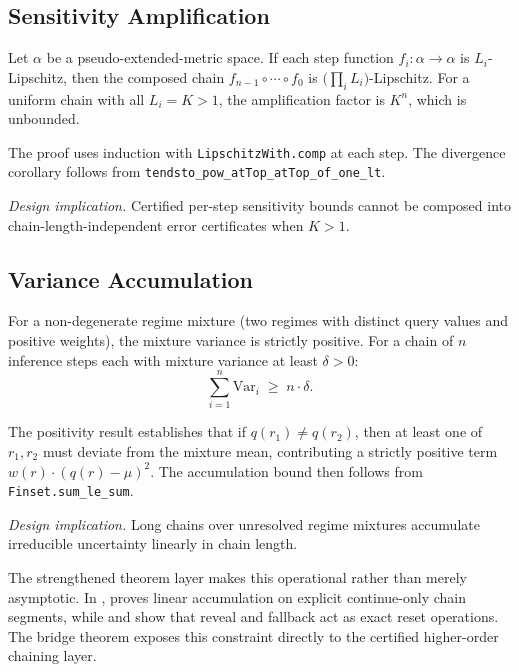 \documentclass[11pt,openany]{report}
\begin{document}
\subsection*{Sensitivity Amplification}

\boundarystart
\begin{theorem}
\label{thm:sensitivity-amplification}
Let $\alpha$ be a pseudo-extended-metric space.  If each step function
$f_i : \alpha \to \alpha$ is $L_i$-Lipschitz, then the composed chain
$f_{n-1} \circ \cdots \circ f_0$ is $\bigl(\prod_{i} L_i\bigr)$-Lipschitz.
For a uniform chain with all $L_i = K > 1$, the amplification factor is
$K^n$, which is unbounded.
\end{theorem}
\boundaryend

The proof uses induction with \texttt{LipschitzWith.comp} at each step.
The divergence corollary follows from
\texttt{tendsto\_pow\_atTop\_atTop\_of\_one\_lt}.

\textit{Design implication.}  Certified per-step sensitivity bounds cannot
be composed into chain-length-independent error certificates when $K > 1$.

\subsection*{Variance Accumulation}

\boundarystart
\begin{theorem}
\label{thm:variance-accumulation}
For a non-degenerate regime mixture (two regimes with distinct query values
and positive weights), the mixture variance is strictly positive.
For a chain of $n$ inference steps each with mixture variance at least
$\delta > 0$:
\[
  \sum_{i=1}^{n} \mathrm{Var}_i \;\ge\; n \cdot \delta.
\]
\end{theorem}
\boundaryend

The positivity result establishes that if $q(r_1) \ne q(r_2)$, then
at least one of $r_1, r_2$ must deviate from the mixture mean, contributing
a strictly positive term $w(r) \cdot (q(r) - \mu)^2$.  The accumulation bound
then follows from \texttt{Finset.sum\_le\_sum}.

\textit{Design implication.}  Long chains over unresolved regime mixtures
accumulate irreducible uncertainty linearly in chain length.

The strengthened theorem layer makes this operational rather than merely
asymptotic.  In
,
 proves linear
accumulation on explicit continue-only chain segments, while
 and
 show that reveal and fallback
act as exact reset operations.  The bridge theorem
 exposes this
constraint directly to the certified higher-order chaining layer.
\end{document}
